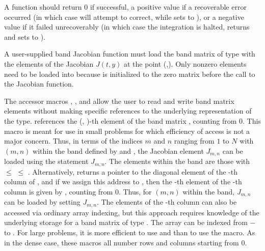 {
  A  function should return 0 if successful, a positive value if a recoverable
  error occurred (in which case {\cvodes} will attempt to correct, while {\cvband} sets
   to ), or a negative 
  value if it failed unrecoverably (in which case the integration is halted, 
  returns  and {\cvband} sets  to 
  ).
}
{
  A user-supplied band Jacobian function must load the band matrix 
  of type  with the elements of the Jacobian $J(t,y)$ at the
  point (,).  Only nonzero elements need to be loaded into
   because  is initialized to the zero matrix before the call to the
  Jacobian function.  

  The accessor macros , , and  
  allow the user to read and write band matrix elements without making specific 
  references to the underlying representation of the  type.
   references the (, )-th element of the 
  band matrix , counting from $0$.
  This macro is meant for use in small problems for which efficiency of access is not
  a major concern.  Thus, in terms of the indices $m$ and $n$ ranging from $1$ to
  $N$ with $(m,n)$ within the band defined by  and
  , the Jacobian element $J_{m,n}$ can be loaded using the 
  statement  $J_{m,n}$. The elements within
  the band are those with  $\le$  $\le$ .
  Alternatively,  returns a pointer to the diagonal element
  of the -th column of , and if we assign this address to 
  , then the -th element of the -th column is
  given by , counting from $0$.
  Thus, for $(m,n)$ within the band, $J_{m,n}$ can be loaded by setting 
   
  $J_{m,n}$.  The elements of the -th column can also be accessed
  via ordinary array indexing, but this approach requires knowledge of
  the underlying storage for a band matrix of type .  
  The array  can be indexed from $-$ to .
  For large problems, it is more efficient to use
   and  than to use the
   macro.  As in the dense case, these macros all number rows
  and columns starting from $0$.  

}

